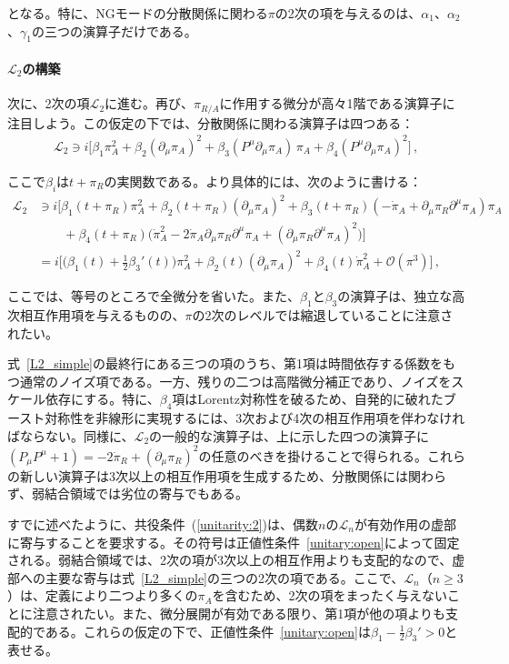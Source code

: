 となる。特に、NGモードの分散関係に関わる$\pi$の2次の項を与えるのは、$\alpha_1$、$\alpha_2$、$\gamma_1$の三つの演算子だけである。

\paragraph{$\mathcal{L}_2$の構築}

次に、2次の項$\mathcal{L}_2$に進む。再び、$\pi_{R/A}$に作用する微分が高々1階である演算子に注目しよう。この仮定の下では、分散関係に関わる演算子は四つある：
\begin{align}
\label{L2_simple_P}
\mathcal{L}_2\ni i\Big[
\beta_1\pi_A^2+\beta_2(\partial_\mu\pi_A)^2
+\beta_3(P^\mu\partial_\mu\pi_A)\,\pi_A
+\beta_4(P^\mu\partial_\mu\pi_A)^2
\Big]\,,
\end{align}

ここで$\beta_i$は$t+\pi_R$の実関数である。より具体的には、次のように書ける：
\begin{align}
\nonumber
\mathcal{L}_2&\ni i\Big[
\beta_1(t+\pi_R)\pi_A^2+\beta_2(t+\pi_R)(\partial_\mu\pi_A)^2
+\beta_3(t+\pi_R)(-\dot{\pi}_A+\partial_\mu\pi_R\partial^\mu\pi_A)\pi_A
\\
\nonumber
&\qquad
+\beta_4(t+\pi_R)\big(\dot{\pi}_A^2-2\dot{\pi}_A\partial_\mu\pi_R\partial^\mu\pi_A
+(\partial_\mu\pi_R\partial^\mu\pi_A)^2\big)
\Big]
\\
\label{L2_simple}
&= i\Big[
\big(\beta_1(t) + \tfrac{1}{2}\beta_3'(t)\big)\pi_A^2+\beta_2(t)(\partial_\mu\pi_A)^2
+\beta_4(t)\dot{\pi}_A^2
+\mathcal{O}(\pi^3)\Big]
\,,
\end{align}

ここでは、等号のところで全微分を省いた。また、$\beta_1$と$\beta_3$の演算子は、独立な高次相互作用項を与えるものの、$\pi$の2次のレベルでは縮退していることに注意されたい。

\medskip
式~\eqref{L2_simple}の最終行にある三つの項のうち、第1項は時間依存する係数をもつ通常のノイズ項である。一方、残りの二つは高階微分補正であり、ノイズをスケール依存にする。特に、$\beta_4$項はLorentz対称性を破るため、自発的に破れたブースト対称性を非線形に実現するには、3次および4次の相互作用項を伴わなければならない。同様に、$\mathcal{L}_2$の一般的な演算子は、上に示した四つの演算子に$(P_\mu P^\mu+1)=-2\dot{\pi}_R+(\partial_\mu\pi_R)^2$の任意のべきを掛けることで得られる。これらの新しい演算子は3次以上の相互作用項を生成するため、分散関係には関わらず、弱結合領域では劣位の寄与でもある。

\medskip
すでに述べたように、共役条件~(\ref{unitarity:2})は、偶数$n$の$\mathcal{L}_n$が有効作用の虚部に寄与することを要求する。その符号は正値性条件~\eqref{unitary:open}によって固定される。弱結合領域では、2次の項が3次以上の相互作用よりも支配的なので、虚部への主要な寄与は式~\eqref{L2_simple}の三つの2次の項である。ここで、$\mathcal{L}_n$（$n\geq3$）は、定義により二つより多くの$\pi_A$を含むため、2次の項をまったく与えないことに注意されたい。また、微分展開が有効である限り、第1項が他の項よりも支配的である。これらの仮定の下で、正値性条件~\eqref{unitary:open}は$\beta_1-\tfrac{1}{2}\beta_3'>0$と表せる。

